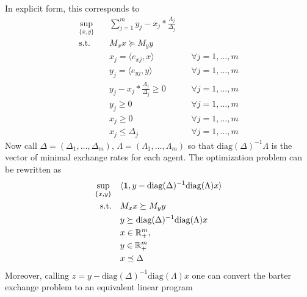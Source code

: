 \documentclass{article}
\begin{document}
In explicit form, this corresponds to 
\begin{align*}
    \sup_{\{x, y\}} \quad& \sum_{j=1}^m y_{j}-x_{j} * \frac{\Lambda_{j}}{\Delta_{j}}\\ 
    \text{s.t.} \quad& M_x x \succeq M_y  y\\
    \quad& x_j = \langle e_{xj}, x \rangle &\quad \forall j=1,\dots,m\\
    \quad& y_j = \langle e_{yj}, y \rangle &\quad \forall j=1,\dots,m\\
    \quad& y_{j}-x_{j} * \frac{\Lambda_{j}}{\Delta_{j}}\geq0 &\quad \forall j=1,\dots,m\\
    \quad& y_{j} \geq 0 &\quad \forall j=1,\dots,m\\
    \quad& x_{j} \geq 0 &\quad \forall j=1,\dots,m\\
    \quad& x_{j} \leq \Delta_{j} &\quad \forall j=1,\dots,m
\end{align*}
Now call $\Delta = (\Delta_1,\dots,\Delta_m)$, $\Lambda = (\Lambda_1,\dots,\Lambda_m)$ so that $\text{diag}(\Delta)^{-1} \Lambda$ is the vector of minimal exchange rates for each agent. The optimization problem can be rewritten as
\begin{align*}
    \sup_{\{x, y\}} \quad& \langle \text{\textbf{1}}, y- \text{diag}(\Delta)^{-1} \text{diag}(\Lambda) x \rangle\\
    \text{s.t.} \quad& M_x x \succeq M_y  y\\
    \quad&  y \succeq\text{diag}(\Delta)^{-1} \text{diag}(\Lambda) x\\
    \quad& x \in \mathbb{R}^m_+,\\ 
    \quad&y \in \mathbb{R}^m_+\\
    \quad& x \preceq \Delta
\end{align*}
Moreover, calling $z=y- \text{diag}(\Delta)^{-1} \text{diag}(\Lambda) x$ one can convert the barter exchange problem to an equivalent linear program 
\end{document}

